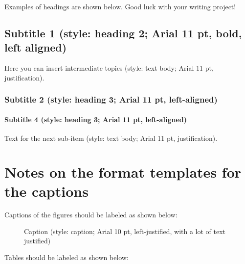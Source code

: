 \documentclass{article}
\begin{document}
Examples of headings are shown below. Good luck with your writing project!

\subsection{Subtitle 1 (style: heading 2; Arial 11 pt, bold, left aligned)}

Here you can insert intermediate topics (style: text body; Arial 11 pt, justification).


\subsubsection{Subtitle 2 (style: heading 3; Arial 11 pt, left-aligned)}


\paragraph{Subtitle 4 (style: heading 3; Arial 11 pt, left-aligned)}

Text for the next sub-item (style: text body; Arial 11 pt, justification).

\section{Notes on the format templates for the captions}

Captions of the figures should be labeled as shown below:

\begin{figure}
	\caption{Caption (style: caption; Arial 10 pt, left-justified, with a lot of text justified)}
\end{figure}

Tables should be labeled as shown below:

\begin{table}
	\caption{Table caption (style: caption; Arial 10 pt, left-justified, with a lot of text justified)}
\end{table}

%
\printbibliography
\end{document}
